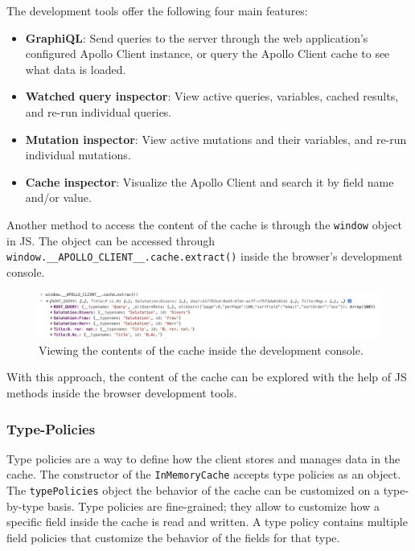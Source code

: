 \noindent The development tools offer the following four main features: \cite{misc:-:background:graphql:apollo-developer-tools}

\begin{itemize}
    \item \textbf{GraphiQL}: Send queries to the server through the web application's configured Apollo Client instance, or query the Apollo Client cache to see what data is loaded.
    \item \textbf{Watched query inspector}: View active queries, variables, cached results, and re-run individual queries.
    \item \textbf{Mutation inspector}: View active mutations and their variables, and re-run individual mutations.
    \item \textbf{Cache inspector}: Visualize the Apollo Client and search it by field name and/or value.
\end{itemize}

\noindent Another method to access the content of the cache is through the \texttt{window} object in \ac{JS}. The object can be accessed through \texttt{window.\_\_APOLLO\_CLIENT\_\_.cache.extract()} inside the browser's development console.

\ifshowImages
  \begin{figure}[H]
    \centering
    \includegraphics[width=1\linewidth]{images/background/graphql/apollo/apollo-cache-browser-window.jpg}
    \caption{Viewing the contents of the cache inside the development console.}\label{fig:background:graphql:apollo:apollo-cache-browser-window}
  \end{figure}
\fi

\noindent  With this approach, the content of the cache can be explored with the help of \ac{JS} methods inside the browser development tools.

\subsubsection{Type-Policies}\label{subsubsection:background:graphql:apollo-server-client:type-policies}

Type policies are a way to define how the client stores and manages data in the cache. The constructor of the \texttt{InMemoryCache} accepts type policies as an object. The \texttt{typePolicies} object the behavior of the cache can be customized on a type-by-type basis. Type policies are fine-grained; they allow to customize how a specific field inside the cache is read and written. A type policy contains multiple field policies that customize the behavior of the fields for that type. \cite{misc:-:background:graphql:apollo-client-cache-reading-writing}

